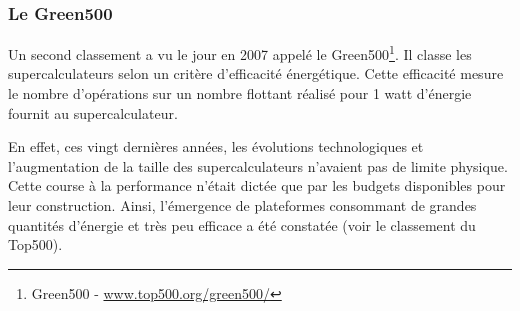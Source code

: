         \begin{table}[]
\centering
{}
\caption{Classement du Top500 de novembre 2019. Les puissances Rpeak (puissance théorique) et Rmax (puissance mesurée par HPL) sont données en pétaFLOPS ($10^{15}$ FLOPS). L'efficacité est le rapport entre Rmax et Rpeak.}
\label{tab:top500}
\end{table}
   
    \subsubsection{Le Green500}
        
        Un second classement a vu le jour en 2007 appelé le Green500\footnote{Green500 - \url{www.top500.org/green500/}}. Il classe les supercalculateurs selon un critère d'efficacité énergétique. Cette efficacité mesure le nombre d'opérations sur un nombre flottant réalisé pour 1 watt d'énergie fournit au supercalculateur. 
    
        En effet, ces vingt dernières années, les évolutions technologiques et l'augmentation de la taille des supercalculateurs n'avaient pas de limite physique. Cette course à la performance n'était dictée que par les budgets disponibles pour leur construction. Ainsi, l'émergence de plateformes consommant de grandes quantités d'énergie et très peu efficace a été constatée (voir le classement du Top500). 
        
